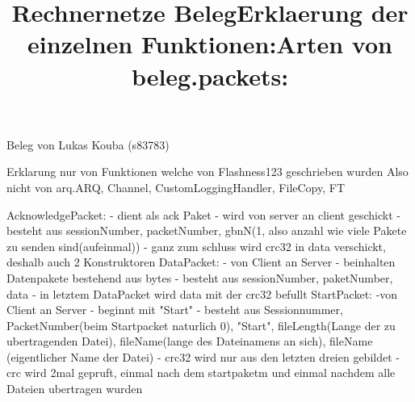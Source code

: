 \documentclass [12pt]{article}
\begin{document}
\title{Rechnernetze Beleg}
\maketitle
\begin{center}
Beleg von Lukas Kouba (s83783)
\end{center}
\title{Erklaerung der einzelnen Funktionen:}
\maketitle
\newline
Erklarung nur von Funktionen welche von Flashness123 geschrieben wurden\newline
Also nicht von arq.ARQ, Channel, CustomLoggingHandler, FileCopy, FT
\newline

\title{Arten von beleg.packets:}
\maketitle
\newline\newline
AcknowledgePacket:\newline
- dient als ack Paket\newline
- wird von server an client geschickt\newline
- besteht aus sessionNumber, packetNumber, gbnN(1, also anzahl wie viele Pakete zu senden sind(aufeinmal))\newline
- ganz zum schluss wird crc32 in data verschickt, deshalb auch 2 Konstruktoren\newline\newline
DataPacket:\newline
- von Client an Server \newline
- beinhalten Datenpakete bestehend aus bytes\newline
- besteht aus sessionNumber, paketNumber, data\newline
- in letztem DataPacket wird data mit der crc32 befullt\newline\newline
StartPacket:\newline
-von Client an Server\newline
- beginnt mit "Start"\newline
- besteht aus Sessionnummer, PacketNumber(beim Startpacket naturlich 0), "Start", fileLength(Lange der zu ubertragenden Datei),\newline
 fileName(lange des Dateinamens an sich), fileName (eigentlicher Name der Datei)\newline
- crc32 wird nur aus den letzten dreien gebildet\newline
- crc wird 2mal gepruft, einmal nach dem startpaketm und einmal nachdem alle Dateien ubertragen wurden\newline\newline
\end{document}
